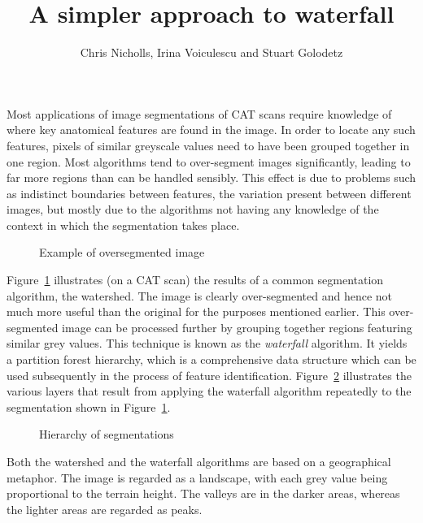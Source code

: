 \documentclass[12pt]{ouclprgsc}
\title{\LARGE \bf
A simpler approach to waterfall
}
\author{Chris Nicholls, Irina Voiculescu and Stuart Golodetz
}
\institute{Oxford University Computing Laboratory}
\begin{document}
\maketitle
\pagestyle{empty}



Most applications of image segmentations of CAT scans require
knowledge of where key anatomical features are found in the image. In
order to locate any such features, pixels of similar greyscale values
need to have been grouped together in one region. Most algorithms tend
to over-segment images significantly, leading to far more regions than
can be handled sensibly. This effect is due to problems such as
indistinct boundaries between features, the variation present between
different images, but mostly due to the algorithms not having any
knowledge of the context in which the segmentation takes place.

\begin{figure}
\centering
\ifpdf
        {}%
\else
\fi
\caption{Example of oversegmented image}
\label{fig:oversegmented}
\end{figure}

Figure~\ref{fig:oversegmented} illustrates (on a CAT scan) the results
of a common segmentation algorithm, the watershed. The image is
clearly over-segmented and hence not much more useful than the
original for the purposes mentioned earlier. This over-segmented image
can be processed further by grouping together regions featuring
similar grey values. This technique is known as the {\em waterfall\/}
algorithm. It yields a partition forest hierarchy, which is a
comprehensive data structure which can be used subsequently in the
process of feature identification.
Figure~\ref{fig:waterfall} illustrates the various layers that result
from applying the waterfall algorithm repeatedly to the segmentation
shown in Figure~\ref{fig:oversegmented}.

\begin{figure}
\centering
\ifpdf
        {}%
\else
\fi
\caption{Hierarchy of segmentations}
\label{fig:waterfall}
\end{figure}


Both the watershed and the waterfall algorithms are based on a
geographical metaphor. The image is regarded as a landscape, with each
grey value being proportional to the terrain height. 
%
The valleys are
in the darker areas, whereas the lighter areas are regarded as peaks.
\end{document}
